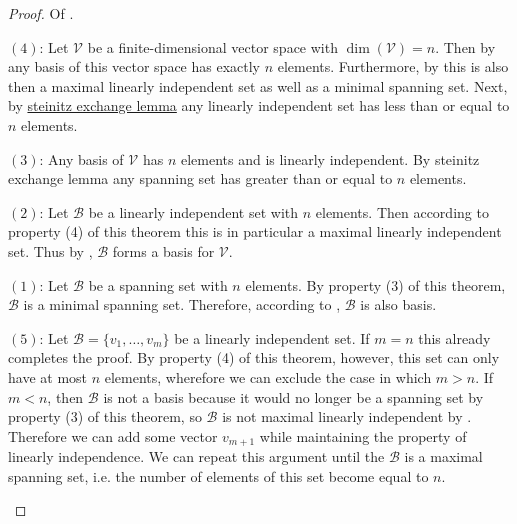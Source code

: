 \begin{proof}
	Of .
	\begin{flushleft}
		$(4)$:
		Let $\mathcal{V}$ be a finite-dimensional vector space with
		$\dim(\mathcal{V})=n$. Then by 
		any basis of this vector space has exactly $n$ elements. Furthermore,
		by  this is also then a maximal
		linearly independent set as well as a minimal spanning set. Next, by
		\hyperref[steinitz-exchange-lemma]{steinitz exchange lemma} any linearly
		independent set has less than or equal to $n$ elements.
	\end{flushleft}
	\begin{flushleft}
		$(3)$:
		Any basis of $\mathcal{V}$ has $n$ elements and is linearly independent.
		By steinitz exchange lemma any spanning set has greater than or equal to
		$n$ elements.
	\end{flushleft}
	\begin{flushleft}
		$(2)$:
		Let $\mathcal{B}$ be a linearly independent set with $n$ elements.
		Then according to property (4) of this theorem this is in particular
		a maximal linearly independent set. Thus by \pref{theorem}{thm-vector-base-properties},
		$\mathcal{B}$ forms a basis for $\mathcal{V}$.
	\end{flushleft}
	\begin{flushleft}
		$(1)$:
		Let $\mathcal{B}$ be a spanning set with $n$ elements. By property (3)
		of this theorem, $\mathcal{B}$ is a minimal spanning set. Therefore,
		according to , $\mathcal{B}$
		is also basis.
	\end{flushleft}
	\begin{flushleft}
		$(5)$:
		Let $\mathcal{B}=\{v_1,\dots,v_m\}$ be a linearly independent set. If
		$m=n$ this already completes the proof. By property (4) of this theorem,
		however, this set can only have at most $n$ elements, wherefore we can
		exclude the case in which $m>n$. If $m<n$, then $\mathcal{B}$ is not a
		basis because it would no longer be a spanning set by property (3) of
		this theorem, so $\mathcal{B}$ is not maximal linearly independent by
		. Therefore we can add some
		vector $v_{m+1}$ while maintaining the property of linearly independence.
		We can repeat this argument until the $\mathcal{B}$ is a maximal spanning
		set, i.e. the number of elements of this set become equal to $n$.
	\end{flushleft}
\end{proof}

